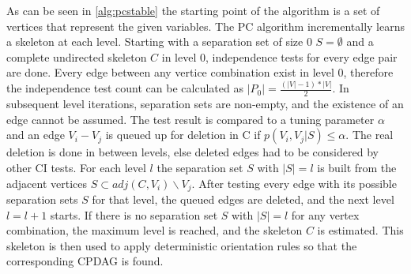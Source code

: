 As can be seen in \ref{alg:pcstable} the starting point of the algorithm is a set of vertices that represent the given variables. The PC algorithm incrementally learns a skeleton at each level. Starting with a separation set of size 0 $S = \emptyset$ and a complete undirected skeleton $C$ in level 0, independence tests for every edge pair are done. Every edge between any vertice combination exist in level 0, therefore the independence test count can be calculated as $|P_0| = \frac{(|V| - 1) * |V|}{2}$. In subsequent level iterations, separation sets are non-empty, and the existence of an edge cannot be assumed. The test result is compared to a tuning parameter $\alpha$ and an edge $V_i - V_j$ is queued up for deletion in C if $p(V_i,V_j|S) \leq \alpha$. The real deletion is done in between levels, else deleted edges had to be considered by other CI tests. For each level $l$ the separation set $S$ with $|S| = l$ is built from the adjacent vertices $S \subset adj(C, V_i)\backslash V_j$. After testing every edge with its possible separation sets $S$ for that level, the queued edges are deleted, and the next level $l=l+1$ starts. If there is no separation set $S$ with $|S| = l$ for any vertex combination, the maximum level is reached, and the skeleton $C$ is estimated.
This skeleton is then used to apply deterministic orientation rules so that the corresponding CPDAG is found. \cite{colomboOrderIndependentConstraintBasedCausal,kalischEstimatingHighDimensionalDirected2007,pearlIntroductionCausalInference2010,schmidtOrderIndependentConstraintBasedCausal2018}
